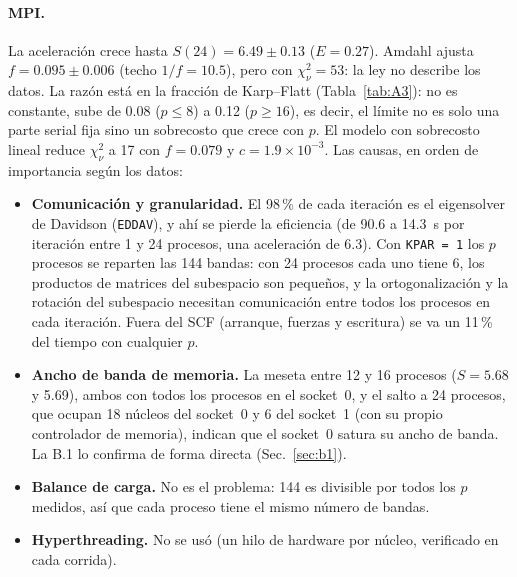 \documentclass[11pt,a4paper]{article}
\newcommand{\cod}[1]{\texttt{#1}}
\begin{document}
\paragraph{MPI.} La aceleración crece hasta $S(24)=6.49\pm0.13$ ($E=0.27$). Amdahl ajusta
$f=0.095\pm0.006$ (techo $1/f=10.5$), pero con $\chi^2_\nu=53$: la ley no describe los datos. La razón está en
la fracción de Karp--Flatt (Tabla~\ref{tab:A3}): no es constante, sube de 0.08 ($p\le8$) a 0.12 ($p\ge16$),
es decir, el límite no es solo una parte serial fija sino un sobrecosto que crece con $p$. El modelo con
sobrecosto lineal reduce $\chi^2_\nu$ a 17 con $f=0.079$ y $c=1.9\times10^{-3}$. Las causas, en orden de
importancia según los datos:
\begin{itemize}[leftmargin=*]
\item \textbf{Comunicación y granularidad.} El 98\,\% de cada iteración es el eigensolver de Davidson
(\cod{EDDAV}), y ahí se pierde la eficiencia (de 90.6 a 14.3~s por iteración entre 1 y 24 procesos, una
aceleración de 6.3). Con \cod{KPAR = 1} los $p$ procesos se reparten las 144 bandas: con 24 procesos cada uno
tiene 6, los productos de matrices del subespacio son pequeños, y la ortogonalización y la rotación del
subespacio necesitan comunicación entre todos los procesos en cada iteración. Fuera del SCF (arranque, fuerzas
y escritura) se va un 11\,\% del tiempo con cualquier $p$.
\item \textbf{Ancho de banda de memoria.} La meseta entre 12 y 16 procesos ($S=5.68$ y 5.69), ambos con todos
los procesos en el socket~0, y el salto a 24 procesos, que ocupan 18 núcleos del socket~0 y 6 del socket~1
(con su propio controlador de memoria), indican que el socket~0 satura su ancho de banda. La B.1 lo confirma
de forma directa (Sec.~\ref{sec:b1}).
\item \textbf{Balance de carga.} No es el problema: 144 es divisible por todos los $p$ medidos, así que cada
proceso tiene el mismo número de bandas.
\item \textbf{Hyperthreading.} No se usó (un hilo de hardware por núcleo, verificado en cada corrida).
\end{itemize}
\end{document}
